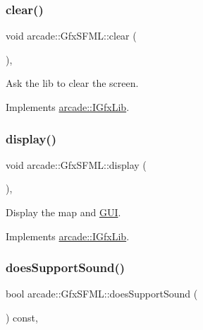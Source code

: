 \subsubsection{\texorpdfstring{clear()}{clear()}}
{\footnotesize\ttfamily void arcade\+::\+Gfx\+S\+F\+M\+L\+::clear (\begin{DoxyParamCaption}{ }\end{DoxyParamCaption})\hspace{0.3cm}{\ttfamily [override]}, {\ttfamily [virtual]}}



Ask the lib to clear the screen. 



Implements \hyperlink{classarcade_1_1_i_gfx_lib_a4116b3d4f503c4a795539b584f77a73d}{arcade\+::\+I\+Gfx\+Lib}.

\mbox{\label{classarcade_1_1_gfx_s_f_m_l_a590d6b932d5200a1367d8a2ff76def61}} 
\subsubsection{\texorpdfstring{display()}{display()}}
{\footnotesize\ttfamily void arcade\+::\+Gfx\+S\+F\+M\+L\+::display (\begin{DoxyParamCaption}{ }\end{DoxyParamCaption})\hspace{0.3cm}{\ttfamily [override]}, {\ttfamily [virtual]}}



Display the map and \hyperlink{classarcade_1_1_g_u_i}{G\+UI}. 



Implements \hyperlink{classarcade_1_1_i_gfx_lib_a7f280525c718a44c1e05cfe0ba5304c3}{arcade\+::\+I\+Gfx\+Lib}.

\mbox{\label{classarcade_1_1_gfx_s_f_m_l_aa8d0f997c7ddcb68526e0f19f5bad77d}} 
\subsubsection{\texorpdfstring{does\+Support\+Sound()}{doesSupportSound()}}
{\footnotesize\ttfamily bool arcade\+::\+Gfx\+S\+F\+M\+L\+::does\+Support\+Sound (\begin{DoxyParamCaption}{ }\end{DoxyParamCaption}) const\hspace{0.3cm}{\ttfamily [override]}, {\ttfamily [virtual]}}



